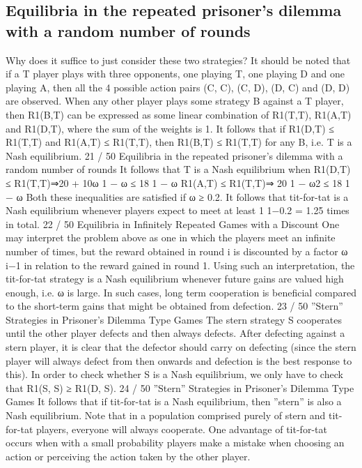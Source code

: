 \documentclass[]{report}
\begin{document}
\subsection{Equilibria in the repeated prisoner’s dilemma with a
random number of rounds}
Why does it suffice to just consider these two strategies?
It should be noted that if a T player plays with three opponents,
one playing T, one playing D and one playing A, then all the 4
possible action pairs (C, C), (C, D), (D, C) and (D, D) are
observed.
When any other player plays some strategy B against a T player,
then R1(B,T) can be expressed as some linear combination of
R1(T,T), R1(A,T) and R1(D,T), where the sum of the weights
is 1.
It follows that if R1(D,T) ≤ R1(T,T) and R1(A,T) ≤ R1(T,T),
then R1(B,T) ≤ R1(T,T) for any B, i.e. T is a Nash equilibrium.
21 / 50
Equilibria in the repeated prisoner’s dilemma with a
random number of rounds
It follows that T is a Nash equilibrium when
R1(D,T) ≤ R1(T,T)⇒20 + 10ω
1 − ω
≤
18
1 − ω
R1(A,T) ≤ R1(T,T)⇒
20
1 − ω2
≤
18
1 − ω
Both these inequalities are satisfied if ω ≥ 0.2. It follows that
tit-for-tat is a Nash equilibrium whenever players expect to meet at
least 1
1−0.2 = 1.25 times in total.
22 / 50
Equilibria in Infinitely Repeated Games with a Discount
One may interpret the problem above as one in which the players
meet an infinite number of times, but the reward obtained in round
i is discounted by a factor ω
i−1
in relation to the reward gained in
round 1.
Using such an interpretation, the tit-for-tat strategy is a Nash
equilibrium whenever future gains are valued high enough, i.e. ω is
large.
In such cases, long term cooperation is beneficial compared to the
short-term gains that might be obtained from defection.
23 / 50
”Stern” Strategies in Prisoner’s Dilemma Type Games
The stern strategy S cooperates until the other player defects and
then always defects.
After defecting against a stern player, it is clear that the defector
should carry on defecting (since the stern player will always defect
from then onwards and defection is the best response to this).
In order to check whether S is a Nash equilibrium, we only have to
check that R1(S, S) ≥ R1(D, S).
24 / 50
”Stern” Strategies in Prisoner’s Dilemma Type Games
It follows that if tit-for-tat is a Nash equilibrium, then ”stern” is
also a Nash equilibrium.
Note that in a population comprised purely of stern and tit-for-tat
players, everyone will always cooperate.
One advantage of tit-for-tat occurs when with a small probability
players make a mistake when choosing an action or perceiving the
action taken by the other player.
\end{document}
